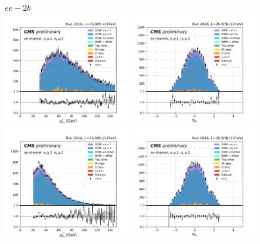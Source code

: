 \begin{figure}[ht]
    \centering
    $ee - 2b$ \\
    \includegraphics[width=0.49\textwidth]{chapters/Appendix/sectionPlots/figures/kinematics_pickles/ee/2b/ee_2b_lepton1_pt.pdf}
    \includegraphics[width=0.49\textwidth]{chapters/Appendix/sectionPlots/figures/kinematics_pickles/ee/2b/ee_2b_lepton1_eta.pdf}
    \includegraphics[width=0.49\textwidth]{chapters/Appendix/sectionPlots/figures/kinematics_pickles/ee/2b/ee_2b_lepton2_pt.pdf}
    \includegraphics[width=0.49\textwidth]{chapters/Appendix/sectionPlots/figures/kinematics_pickles/ee/2b/ee_2b_lepton2_eta.pdf}

\end{figure}
